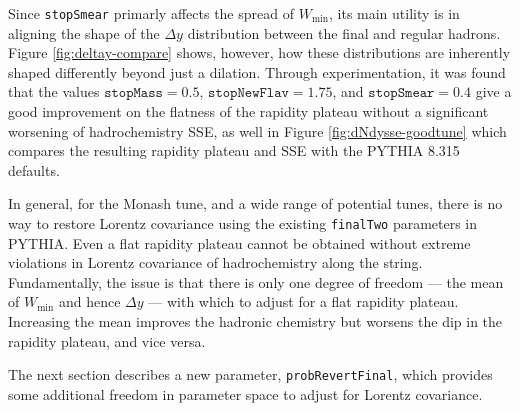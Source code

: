 \documentclass[12pt,a4paper]{report}
\begin{document}
Since \texttt{stopSmear} primarly affects the spread of $W_\text{min}$, its main utility is in aligning the shape of the $\Delta y$ distribution between the final and regular hadrons. Figure \ref{fig:deltay-compare} shows, however, how these distributions are inherently shaped differently beyond just a dilation. Through experimentation, it was found that the values $\texttt{stopMass} = 0.5$, $\texttt{stopNewFlav} = 1.75$, and $\texttt{stopSmear} = 0.4$ give a good improvement on the flatness of the rapidity plateau without a significant worsening of hadrochemistry SSE, as well in Figure \ref{fig:dNdysse-goodtune} which compares the resulting rapidity plateau and SSE with the PYTHIA 8.315 defaults.

In general, for the Monash tune, and a wide range of potential tunes, there is no way to restore Lorentz covariance using the existing \texttt{finalTwo} parameters in PYTHIA. Even a flat rapidity plateau cannot be obtained without extreme violations in Lorentz covariance of hadrochemistry along the string. Fundamentally, the issue is that there is only one degree of freedom --- the mean of $W_\text{min}$ and hence $\Delta y$ --- with which to adjust for a flat rapidity plateau. Increasing the mean improves the hadronic chemistry but worsens the dip in the rapidity plateau, and vice versa.

The next section describes a new parameter, \texttt{probRevertFinal}, which provides some additional freedom in parameter space to adjust for Lorentz covariance.
\end{document}
